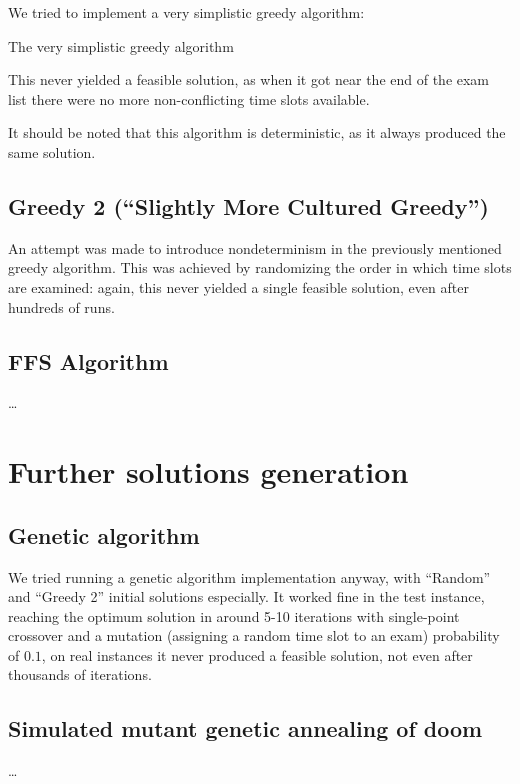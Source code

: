 \documentclass[11pt, a4paper, leqno]{article}
\begin{document}
	We tried to implement a very simplistic greedy algorithm:
	
	\begin{algorithm}[H]
		\caption{The very simplistic greedy algorithm}
	\end{algorithm}

	This never yielded a feasible solution, as when it got near the end of the exam list there were no more non-conflicting time slots available.
	
	It should be noted that this algorithm is deterministic, as it always produced the same solution.
	
	\subsection{Greedy 2 (``Slightly More Cultured Greedy'')}
	
	An attempt was made to introduce nondeterminism in the previously mentioned greedy algorithm. This was achieved by randomizing the order in which time slots are examined: again, this never yielded a single feasible solution, even after hundreds of runs.
	
	\subsection{FFS Algorithm}
	
	\dots
	
	\section{Further solutions generation}
	
	\subsection{Genetic algorithm}
	
	We tried running a genetic algorithm implementation anyway, with ``Random'' and ``Greedy 2'' initial solutions especially. It worked fine in the test instance, reaching the optimum solution in around 5-10 iterations with single-point crossover and a mutation (assigning a random time slot to an exam) probability of $0.1$, on real instances it never produced a feasible solution, not even after thousands of iterations.
	
	\subsection{Simulated mutant genetic annealing of doom\texttrademark}
	
	\dots
	
\end{document}
